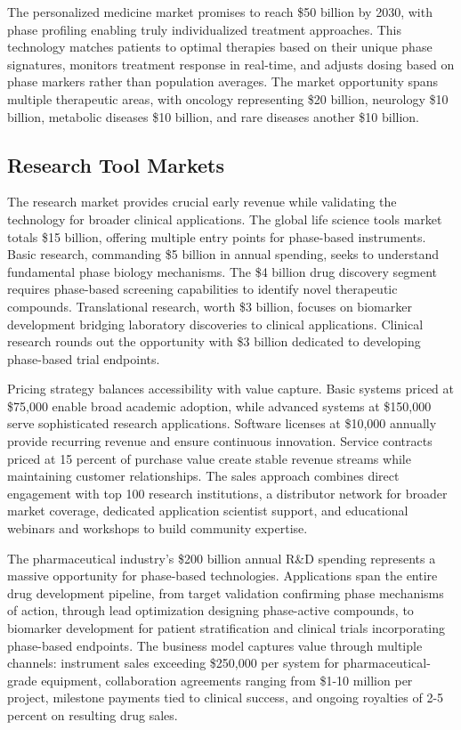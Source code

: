\documentclass[12pt,a4paper]{report}
\begin{document}
The personalized medicine market promises to reach \$50 billion by 2030, with phase profiling enabling truly individualized treatment approaches. This technology matches patients to optimal therapies based on their unique phase signatures, monitors treatment response in real-time, and adjusts dosing based on phase markers rather than population averages. The market opportunity spans multiple therapeutic areas, with oncology representing \$20 billion, neurology \$10 billion, metabolic diseases \$10 billion, and rare diseases another \$10 billion.

\subsection{Research Tool Markets}

The research market provides crucial early revenue while validating the technology for broader clinical applications. The global life science tools market totals \$15 billion, offering multiple entry points for phase-based instruments. Basic research, commanding \$5 billion in annual spending, seeks to understand fundamental phase biology mechanisms. The \$4 billion drug discovery segment requires phase-based screening capabilities to identify novel therapeutic compounds. Translational research, worth \$3 billion, focuses on biomarker development bridging laboratory discoveries to clinical applications. Clinical research rounds out the opportunity with \$3 billion dedicated to developing phase-based trial endpoints.

Pricing strategy balances accessibility with value capture. Basic systems priced at \$75,000 enable broad academic adoption, while advanced systems at \$150,000 serve sophisticated research applications. Software licenses at \$10,000 annually provide recurring revenue and ensure continuous innovation. Service contracts priced at 15 percent of purchase value create stable revenue streams while maintaining customer relationships. The sales approach combines direct engagement with top 100 research institutions, a distributor network for broader market coverage, dedicated application scientist support, and educational webinars and workshops to build community expertise.

The pharmaceutical industry's \$200 billion annual R&D spending represents a massive opportunity for phase-based technologies. Applications span the entire drug development pipeline, from target validation confirming phase mechanisms of action, through lead optimization designing phase-active compounds, to biomarker development for patient stratification and clinical trials incorporating phase-based endpoints. The business model captures value through multiple channels: instrument sales exceeding \$250,000 per system for pharmaceutical-grade equipment, collaboration agreements ranging from \$1-10 million per project, milestone payments tied to clinical success, and ongoing royalties of 2-5 percent on resulting drug sales.
\end{document}
